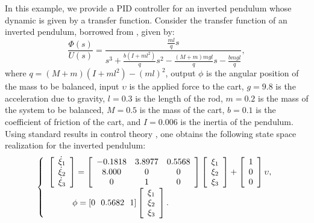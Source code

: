 \documentclass{amsart}
\numberwithin{equation}{section}
\def\myparagraph#1{{\smallskip\noindent{\bf #1}}}
\begin{document}
\myparagraph{PID controller}
In this example, we provide a PID controller for an inverted pendulum whose dynamic is given by a transfer function. Consider the transfer function of an inverted pendulum, borrowed from \cite{cmu_examples}, given by:
\begin{equation}
\frac{\Phi(s)}{U(s)}={\frac{\frac{ml}{q}s}{s^3+\frac{b(I+ml^2)}{q}s^2-\frac{(M+m)mgl}{q}s-\frac{bmgl}{q}}},
\end{equation}
where $q=(M+m)(I+ml^2)-(ml)^2$, output $\phi$ is the angular position of the mass to be balanced, input $\upsilon$ is the applied force to the cart, $g=9.8$ is the acceleration due to gravity, $l=0.3$ is the length of the rod, $m=0.2$ is the mass of the system to be balanced, $M=0.5$ is the mass of the cart, $b=0.1$ is the coefficient of friction of the cart, and $I=0.006$ is the inertia of the pendulum. Using standard results in control theory \cite{kailath}, one obtains the following state space realization for the inverted pendulum:
\begin{align}
\nonumber
\left\{\begin{array}{l}\left[{\begin{array}{c}
\dot\xi_1\\
\dot\xi_2\\
\dot\xi_3\\
 \end{array}}\right]=\left[ {\begin{array}{ccc}
-0.1818&3.8977&0.5568\\
8.000&0&0\\
0&1&0\\
 \end{array}}\right]\left[{\begin{array}{c}
\xi_1\\
\xi_2\\
\xi_3\\
 \end{array}}\right]+\left[ {\begin{array}{c}
1\\0\\ 0\\
 \end{array}}\right]\upsilon,\\\hspace{10mm}\phi=[0~~0.5682~~1]\left[{\begin{array}{c}
\xi_1\\
\xi_2\\
\xi_3\\
 \end{array}}\right].\end{array}\right. 
\end{align}  
\end{document}
